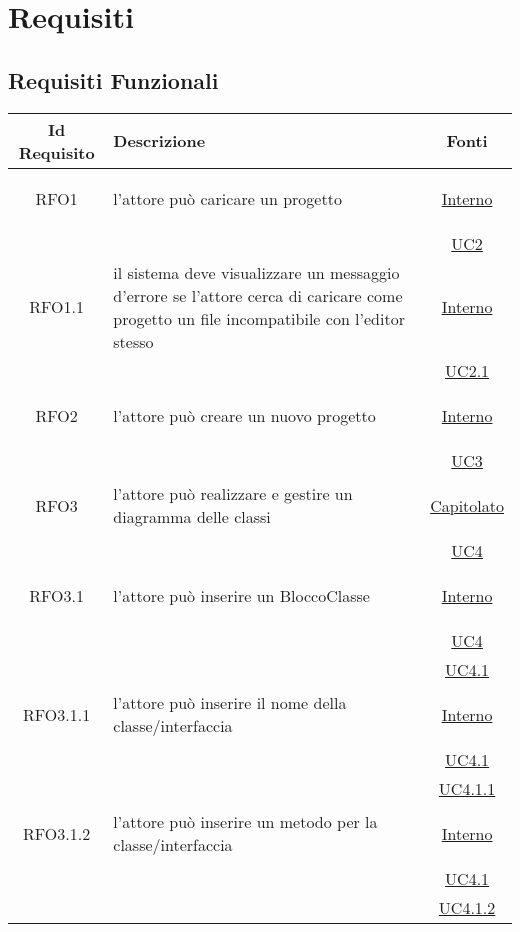 \section{Requisiti}

\subsection{Requisiti Funzionali}
\normalsize
\begin{longtable}{|c|>{\centering}m{7cm}|c|}
\hline
\textbf{Id Requisito} & \textbf{Descrizione} & \textbf{Fonti}\\
\hline
\endhead
\hypertarget{RFO1}{RFO1} & l'attore può caricare un progetto &  \hyperlink{Interno}{Interno}\\
& & \hyperref[UC2]{UC2}\\ \hline

\hypertarget{RFO1.1}{RFO1.1} & il sistema deve visualizzare un messaggio d'errore se l'attore cerca di caricare come progetto un file incompatibile con l'editor stesso &  \hyperlink{Interno}{Interno}\\
& & \hyperref[UC2.1]{UC2.1}\\ \hline

\hypertarget{RFO2}{RFO2} & l'attore può creare un nuovo progetto &  \hyperlink{Interno}{Interno}\\
& & \hyperref[UC3]{UC3}\\ \hline

\hypertarget{RFO3}{RFO3} & l'attore può realizzare e gestire un diagramma delle classi & \hyperlink{Capitolato}{Capitolato}\\
& & \hyperref[UC4]{UC4}\\ \hline

\hypertarget{RFO3.1}{RFO3.1} & l'attore può inserire un BloccoClasse &  \hyperlink{Interno}{Interno}\\
& &\hyperref[UC4]{UC4}\\
& &\hyperref[UC4.1]{UC4.1}\\ \hline

\hypertarget{RFO3.1.1}{RFO3.1.1} & l'attore può inserire il nome della classe/interfaccia & \hyperlink{Interno}{Interno}\\
& &\hyperref[UC4.1]{UC4.1}\\
& &\hyperref[UC4.1.1]{UC4.1.1}\\ \hline

\hypertarget{RFO3.1.2}{RFO3.1.2} & l'attore può inserire un metodo per la classe/interfaccia & \hyperlink{Interno}{Interno}\\
& &\hyperref[UC4.1]{UC4.1}\\
& &\hyperref[UC4.1.2]{UC4.1.2}\\ \hline


\end{longtable}
